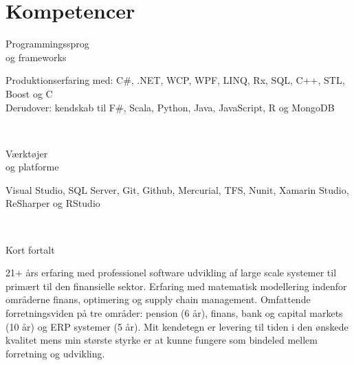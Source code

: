 \documentclass[10pt, a4paper]{article}
\begin{document}
\section{Kompetencer}
\begin{Row}%
  \begin{Cell}{1}
    Programmingssprog \\[1ex]
    og frameworks
  \end{Cell}
  \begin{Cell}{3}
    Produktionserfaring med: C\#, .NET, WCP, WPF, LINQ, Rx, SQL,  %
    C++, STL, Boost og C \\
    Derudover: kendskab til F\#, Scala, Python, Java, JavaScript, R og
    MongoDB
  \end{Cell}
\end{Row}
\\[0.5cm]
\begin{Row}%
  \begin{Cell}{1}
    Værktøjer \\[1ex]
    og platforme
  \end{Cell}
  \begin{Cell}{3}
    Visual Studio, SQL Server, Git, Github, Mercurial, TFS, Nunit, Xamarin
    Studio, ReSharper og RStudio
  \end{Cell}
\end{Row}
\\[0.5cm]
\begin{Row}%
  \begin{Cell}{1}
    Kort fortalt
  \end{Cell}
  \begin{Cell}{3}
    21+ års erfaring med professionel software udvikling af large scale systemer
    til primært til den finansielle sektor. Erfaring med matematisk modellering
    indenfor områderne finans, optimering og supply chain management. Omfattende
    forretningsviden på tre områder: pension (6 år), finans, bank og capital
    markets (10 år) og ERP systemer (5 år). Mit kendetegn er levering til tiden
    i den ønskede kvalitet mens min største styrke er at kunne fungere som
    bindeled mellem forretning og udvikling.
  \end{Cell}
\end{Row}

\end{document}
